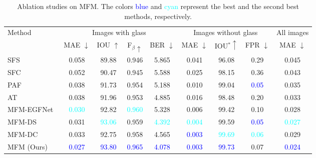 \begin{table*}[ht]
\renewcommand\arraystretch{1.5}
\setlength\tabcolsep{5pt}
\centering
\caption{Ablation studies on MFM. The colors \textcolor{blue}{blue} and \textcolor{cyan}{cyan} represent the best and the second best methods, respectively.}
\label{tab:ab_mfm}
\begin{tabular}{lcccccccc} 
\toprule
\multirow{2}{*}{Method} & \multicolumn{4}{c}{Images with glass} & \multicolumn{3}{c}{Images without glass} & All images        \\ 
\cmidrule[0.25pt](lr){2-5} \cmidrule[0.25pt](lr){6-8} \cmidrule[0.25pt](lr){9-9} 
& MAE $\downarrow$                      & IOU $\uparrow$                        & F$_\beta\uparrow$                     & BER $\downarrow$                      & MAE $\downarrow$                      & IOU$^\ast\uparrow$                    & FPR $\downarrow$                     & MAE $\downarrow$  \\ 
\midrule
SFS & \multicolumn{1}{c}{0.058} & \multicolumn{1}{c}{89.88} & \multicolumn{1}{c}{0.946} & 5.865 & \multicolumn{1}{c}{0.041} & \multicolumn{1}{c}{96.08} & 0.29 & 0.045\\ 
SFC & \multicolumn{1}{c}{0.052} & \multicolumn{1}{c}{90.47} & \multicolumn{1}{c}{0.945} & 5.588 & \multicolumn{1}{c}{0.025} & \multicolumn{1}{c}{98.15} & 0.36 & 0.043\\ 
PAF~\cite{kalra2020deep} & \multicolumn{1}{c}{0.038} & \multicolumn{1}{c}{91.73} & \multicolumn{1}{c}{0.954} & 5.188 & \multicolumn{1}{c}{0.010} & \multicolumn{1}{c}{99.04} & \textcolor{blue}{0.05} & 0.035\\ 
AT~\cite{li2020rgb} & \multicolumn{1}{c}{0.038} & \multicolumn{1}{c}{91.96} & \multicolumn{1}{c}{0.953} & 4.885 & \multicolumn{1}{c}{0.016} & \multicolumn{1}{c}{98.48} & 0.20 & 0.033\\ 
MFM-EGFNet~\cite{zhou2022edge} & \multicolumn{1}{c}{\textcolor{cyan}{0.030}} & \multicolumn{1}{c}{92.82} & \multicolumn{1}{c}{\textcolor{cyan}{0.960}} & 5.328 & \multicolumn{1}{c}{0.006} & \multicolumn{1}{c}{99.42} & 0.10 & 0.028\\
MFM-DS & \multicolumn{1}{c}{0.031} & \multicolumn{1}{c}{\textcolor{cyan}{93.06}} & \multicolumn{1}{c}{0.959} & \textcolor{cyan}{4.392} & \multicolumn{1}{c}{\textcolor{cyan}{0.004}} & \multicolumn{1}{c}{99.59} & \textcolor{blue}{0.05} & \textcolor{cyan}{0.027}\\ 
MFM-DC & \multicolumn{1}{c}{0.033} & \multicolumn{1}{c}{92.75} & \multicolumn{1}{c}{0.958} & 4.565 & \multicolumn{1}{c}{\textcolor{blue}{0.003}} & \multicolumn{1}{c}{\textcolor{cyan}{99.69}} & \textcolor{cyan}{0.06} & 0.029\\ \hline


MFM (Ours) & \multicolumn{1}{c}{\textcolor{blue}{0.027}} & \multicolumn{1}{c}{\textcolor{blue}{93.80}} & \multicolumn{1}{c}{\textcolor{blue}{0.965}} & \textcolor{blue}{4.078} & \multicolumn{1}{c}{\textcolor{blue}{0.003}} & \multicolumn{1}{c}{\textcolor{blue}{99.73}} & 0.07 &\textcolor{blue}{0.024}\\ 
\bottomrule
\end{tabular}
\end{table*}







